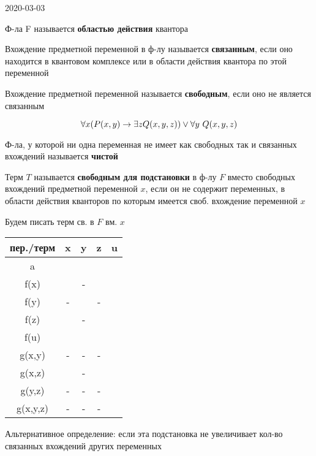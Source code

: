 \documentclass[main]{subfiles}
\begin{document}
\begin{lect} {2020-03-03}
\begin{definition}[предикатная ф-ла]
        Ф-ла F называется {\bf областью действия} квантора
    \end{definition}

    \begin{definition}
        Вхождение предметной переменной в ф-лу называется {\bf связанным}, если оно находится в квантовом комплексе или в области действия квантора по этой переменной
    \end{definition}

    \begin{definition}
        Вхождение предметной переменной называется {\bf свободным}, если оно не является связанным
    \end{definition}

    \begin{Example}
        \[\forall x (P(x,y) \rightarrow \exists z Q(x,y,z)) \vee \forall y\ Q(x,y,z)\]
    \end{Example}

    \begin{definition}
        Ф-ла, у которой ни одна переменная не имеет как свободных так и связанных вхождений называется {\bf чистой}
    \end{definition}

    \begin{definition}
        Терм $T$ называется {\bf свободным для подстановки} в ф-лу $F$ вместо свободных вхождений предметной переменной $x$, если он не содержит переменных, в области действия кванторов по которым имеется своб. вхождение переменной $x$

        Будем писать терм св. в $F$ вм. $x$
    \end{definition}

    \begin{tabular}{c|c|c|c|c}
        пер./терм & x & y & z & u\\
        \hline
        a &  &  &  & \\
        f(x) &  & - &  & \\
        f(y) & - &  & - & \\
        f(z) &  & - &  & \\
        f(u) &  &  &  & \\
        g(x,y) & - & - & - & \\
        g(x,z) &  & - &  & \\
        g(y,z) & - & - & - & \\
        g(x,y,z) & - & - & - &
    \end{tabular}

    Альтернативное определение: если эта подстановка не увеличивает кол-во связанных вхождений других переменных


\end{lect}
\end{document}
